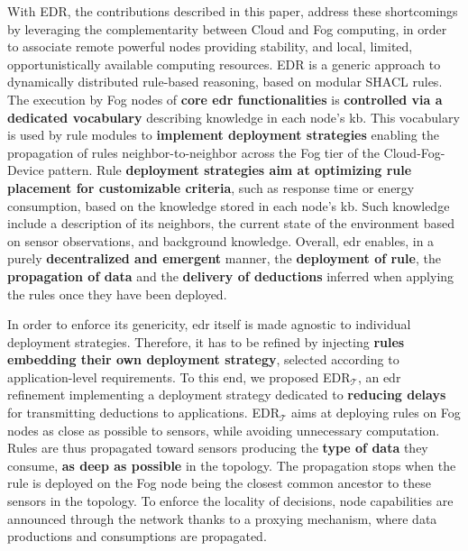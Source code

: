 \documentclass{iosart2c}
\newcommand{\edr}{EDR\xspace}
\newcommand{\edrt}{EDR$_{\mathcal{T}}$\xspace}
\begin{document}
With \edr, the contributions described in this paper, address these shortcomings by leveraging the complementarity between Cloud and Fog computing, in order to associate remote powerful nodes providing stability, and local, limited, opportunistically available computing resources.
\edr is a generic approach to dynamically distributed rule-based reasoning, based on modular SHACL rules.
The execution by Fog nodes of \textbf{core \gls{edr} functionalities} is \textbf{controlled via a dedicated vocabulary} describing knowledge in each node's \gls{kb}.
This vocabulary is used by rule modules to \textbf{implement deployment strategies} enabling the propagation of rules neighbor-to-neighbor across the Fog tier of the Cloud-Fog-Device pattern.
Rule \textbf{deployment strategies aim at optimizing rule placement for customizable criteria}, such as response time or energy consumption, based on the knowledge stored in each node's \gls{kb}.
Such knowledge include a description of its neighbors, the current state of the environment based on sensor observations, and background knowledge.
Overall, \gls{edr} enables, in a purely \textbf{decentralized and emergent} manner, the \textbf{deployment of rule}, the \textbf{propagation of data} and the \textbf{delivery of deductions} inferred when applying the rules once they have been deployed.

In order to enforce its genericity, \gls{edr} itself is made agnostic to individual deployment strategies.
Therefore, it has to be refined by injecting \textbf{rules embedding their own deployment strategy}, selected according to application-level requirements.
To this end, we proposed \edrt, an \gls{edr} refinement implementing a deployment strategy dedicated to \textbf{reducing delays} for transmitting deductions to applications.
\edrt aims at deploying rules on Fog nodes as close as possible to sensors, while avoiding unnecessary computation.
Rules are thus propagated toward sensors producing the \textbf{type of data} they consume, \textbf{as deep as possible} in the topology. 
The propagation stops when the rule is deployed on the Fog node being the closest common ancestor to these sensors in the topology.
To enforce the locality of decisions, node capabilities are announced through the network thanks to a proxying mechanism, where data productions and consumptions are propagated.
\end{document}
